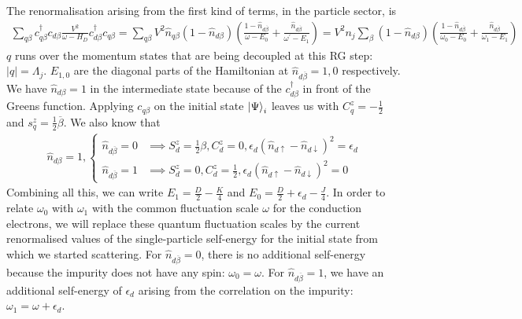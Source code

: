 The renormalisation arising from the first kind of terms, in the particle sector, is
\begin{equation}\begin{aligned}
	\sum_{q\beta}c^\dagger_{q\beta}c_{d\beta}\frac{V^2}{\omega - H_D}c^\dagger_{d\beta}c_{q\beta} = \sum_{q\beta}V^2 \hat n_{q\beta} \left( 1 - \hat n_{d\beta} \right)\left( \frac{1-\hat n_{d \overline\beta }}{\omega - E_0} + \frac{\hat n_{d \overline\beta}}{\omega^\prime - E_1}\right) = V^2 n_j\sum_{\beta}\left( 1 - \hat n_{d\beta} \right)\left( \frac{1-\hat n_{d \overline\beta }}{\omega_0 - E_0} + \frac{\hat n_{d \overline\beta}}{\omega_1 - E_1}\right)
\end{aligned}\end{equation}
\(q\) runs over the momentum states that are being decoupled at this RG step: \(|q| = \Lambda_j\). \(E_{1,0}\) are the diagonal parts of the Hamiltonian at \(\hat n_{d\overline \beta}=1,0\) respectively. We have \(\hat n_{d\beta}=1\) in the intermediate state because of the \(c^\dagger_{d\beta}\) in front of the Greens function. Applying \(c_{q\beta}\) on the initial state \(\ket{\Psi}_i\) leaves us with \(C^z_q = - \frac{1}{2}\) and \(s^z_q = \frac{1}{2}\overline\beta\). We also know that
\begin{equation}\begin{aligned}
	\hat n_{d\beta}=1,
	\begin{cases}
		\hat n_{d\overline\beta}=0 &\implies S_d^z = \frac{1}{2}\beta, C_d^z = 0, \epsilon_d\left(\hat n_{d\uparrow} - \hat n_{d \downarrow}\right)^2 = \epsilon_d\\	
		\hat n_{d\overline\beta}=1 &\implies S_d^z = 0, C_d^z = \frac{1}{2}, \epsilon_d\left(\hat n_{d\uparrow} - \hat n_{d \downarrow}\right)^2 = 0
	\end{cases}
\end{aligned}\end{equation}
Combining all this, we can write \(E_1 = \frac{D}{2} - \frac{K}{4}\) and \(E_0 = \frac{D}{2} + \epsilon_d - \frac{J}{4}\). In order to relate \(\omega_0\) with \(\omega_1\) with the common fluctuation scale \(\omega\) for the conduction electrons, we will replace these quantum fluctuation scales by the current renormalised values of the single-particle self-energy for the initial state from which we started scattering. For \(\hat n_{d\overline\beta}=0\), there is no additional self-energy because the impurity does not have any spin: \(\omega_0 = \omega\). For \(\hat n_{d\overline\beta} = 1\), we have an additional self-energy of \(\epsilon_d\) arising from the correlation on the impurity: \(\omega_1 = \omega + \epsilon_d\).
